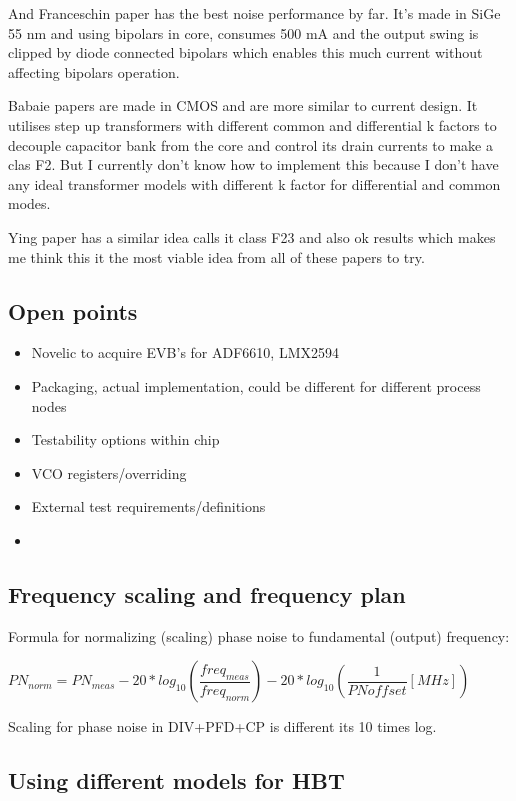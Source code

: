 \documentclass{article}
\begin{document}
And Franceschin paper has the best noise performance by far. It's made in SiGe 55 nm and using bipolars in core, consumes 500 mA and the output swing is clipped by diode connected bipolars which enables this much current without affecting bipolars operation.

Babaie papers are made in CMOS and are more similar to current design. It utilises step up transformers with different common and differential k factors to decouple capacitor bank from the core and control its drain currents to make a clas F2. But I currently don't know how to implement this because I don't have any ideal transformer models with different k factor for differential and common modes.

Ying paper has a similar idea calls it class F23 and also ok results which makes me think this it the most viable idea from all of these papers to try.


\subsection{Open points}

\begin{itemize}
	\item Novelic to acquire EVB's for ADF6610, LMX2594 %
	\item Packaging, actual implementation, could be different for different process nodes
	\item Testability options within chip
	\item VCO registers/overriding
	\item External test requirements/definitions
	\item 
\end{itemize}

\subsection{Frequency scaling and frequency plan}

Formula for normalizing (scaling) phase noise to fundamental (output) frequency:

$PN_{norm}=PN_{meas}-20*log_{10}(\dfrac{freq_{meas}}{freq_{norm}})-20*log_{10}(\dfrac{1}{PNoffset}[MHz])$

Scaling for phase noise in DIV+PFD+CP is different its 10 times log.


\subsection{Using different models for HBT}
\end{document}

